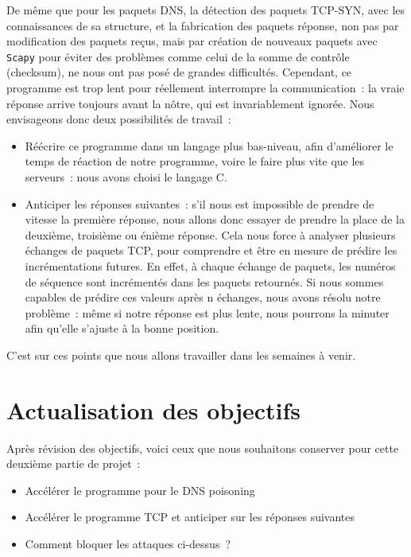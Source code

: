 \documentclass[a4paper, 12pt,twoside]{article}
\begin{document}
            De même que pour les paquets DNS, la détection des paquets TCP-SYN, avec les connaissances de sa structure, et la fabrication des paquets réponse, non pas par modification des paquets reçus, mais par création de nouveaux paquets avec \verb!Scapy! pour éviter des problèmes comme celui de la somme de contrôle (checksum), ne nous ont pas posé de grandes difficultés. Cependant, ce programme est trop lent pour réellement interrompre la communication~: la vraie réponse arrive toujours avant la nôtre, qui est invariablement ignorée. Nous envisageons donc deux possibilités de travail~:
            \begin{itemize}[label=\color{bleu303}\textbullet{}]
                \item Réécrire ce programme dans un langage plus bas-niveau, afin d'améliorer le temps de réaction de notre programme, voire le faire plus vite que les serveurs~: nous avons choisi le langage C.
                \item Anticiper les réponses suivantes~: s'il nous est impossible de prendre de vitesse la première réponse, nous allons donc essayer de prendre la place de la deuxième, troisième ou énième réponse. Cela nous force à analyser plusieurs échanges de paquets TCP, pour comprendre et être en mesure de prédire les incrémentations futures. En effet, à chaque échange de paquets, les numéros de séquence sont incrémentés dans les paquets retournés. Si nous sommes capables de prédire ces valeurs après n échanges, nous avons résolu notre problème~: même si notre réponse est plus lente, nous pourrons la minuter afin qu'elle s'ajuste à la bonne position.
            \end{itemize}


            C'est sur ces points que nous allons travailler dans les semaines à venir.

    \clearpage
    \section{Actualisation des objectifs}

        Après révision des objectifs, voici ceux que nous souhaitons conserver pour cette deuxième partie de projet~:

        \begin{itemize}[label=\color{bleu303}\textbullet{}]
            \item Accélérer le programme pour le DNS poisoning
            \item Accélérer le programme TCP et anticiper sur les réponses suivantes
            \item Comment bloquer les attaques ci-dessus~?
        \end{itemize}
\end{document}
